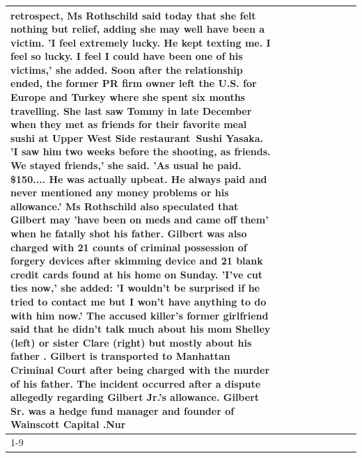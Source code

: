 \begin{table}[H]
\begin{tabular}{lllrlllll}
retrospect, Ms Rothschild said today that she felt nothing but relief, adding she may well have been a victim. 'I feel extremely lucky. He kept texting me. I feel so lucky. I feel I could have been one of his victims,' she added. Soon after the relationship ended, the former PR firm owner left the U.S. for Europe and Turkey where she spent six months  travelling. She last saw Tommy in late December when they met as friends for their favorite meal sushi at Upper West Side restaurant Sushi Yasaka. 'I saw him two weeks before the shooting, as friends. We stayed friends,' she said. 'As usual he paid. \$150.... He was actually upbeat. He always paid and never mentioned any money problems or his allowance.' Ms Rothschild also speculated that Gilbert may 'have been on meds and came off them' when he fatally shot his father. Gilbert was also charged with 21 counts of criminal possession of forgery devices after skimming device and 21 blank credit cards found at his home on Sunday. 'I've cut ties now,' she added: 'I wouldn’t be surprised if he tried to contact me but I won’t have anything to do with him now.' The accused killer's former girlfriend said that he didn't talk much about his mom Shelley (left) or sister Clare (right) but mostly about his father . Gilbert is transported to Manhattan Criminal Court  after being charged with the murder of his father. The incident occurred after a dispute allegedly regarding Gilbert Jr.'s allowance. Gilbert Sr. was a hedge fund manager and founder of Wainscott Capital .Nur \\
\cline{1-9} \cline{2-9}

\end{tabular}
\end{table}
